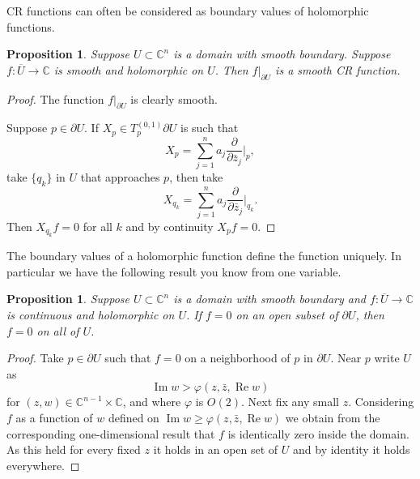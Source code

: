 \documentclass[12pt,openany]{book}
\renewcommand{\Re}{\operatorname{Re}}
\renewcommand{\Im}{\operatorname{Im}}
\newcommand{\C}{{\mathbb{C}}}
\theoremstyle{plain}
\newtheorem{prop}[thm]{Proposition}
\theoremstyle{remark}
\theoremstyle{definition}
\theoremstyle{exercise}
\theoremstyle{example}
\begin{document}
CR functions can often be considered as boundary values of
holomorphic functions.

\begin{prop}
Suppose $U \subset \C^n$ is a domain with smooth boundary.  Suppose
$f \colon \overline{U} \to \C$ is smooth and holomorphic on $U$.
Then $f|_{\partial U}$ is a smooth CR function.
\end{prop}

\begin{proof}
The function $f|_{\partial U}$ is clearly smooth.

Suppose $p \in \partial U$.
If $X_p \in T_p^{(0,1)} \partial U$ is such that
\begin{equation*}
X_p = \sum_{j=1}^n a_j \frac{\partial}{\partial \bar{z}_j} \Big|_p ,
\end{equation*}
take $\{ q_k \}$ in $U$ that approaches $p$, then take
\begin{equation*}
X_{q_k} = \sum_{j=1}^n a_j \frac{\partial}{\partial \bar{z}_j} \Big|_{q_k} .
\end{equation*}
Then $X_{q_k} f = 0$ for all $k$ and by continuity $X_p f = 0$.
\end{proof}

The boundary values of a holomorphic function define the function uniquely.  In
particular we have the following result you know from one variable.

\begin{prop}
Suppose $U \subset \C^n$ is a domain with smooth boundary and $f \colon \overline{U} \to \C$ is 
continuous and holomorphic on $U$.  If $f=0$ on an open subset of $\partial
U$, then $f=0$ on all of $U$.
\end{prop}

\begin{proof}
Take $p \in \partial U$ such that $f=0$ on a neighborhood of $p$ in
$\partial U$.  Near $p$ write $U$ as
\begin{equation*}
\Im w > \varphi(z,\bar{z},\Re w)
\end{equation*}
for $(z,w) \in \C^{n-1} \times \C$, and where $\varphi$ is $O(2)$.
Next fix any small $z$.  Considering $f$ as a function of $w$
defined on
$\Im w \geq \varphi(z,\bar{z},\Re w)$ we obtain from the corresponding
one-dimensional result that $f$ is identically zero inside the domain.
As this held for every fixed $z$ it holds in an open set of $U$ and by
identity it holds everywhere.
\end{proof}
\end{document}
